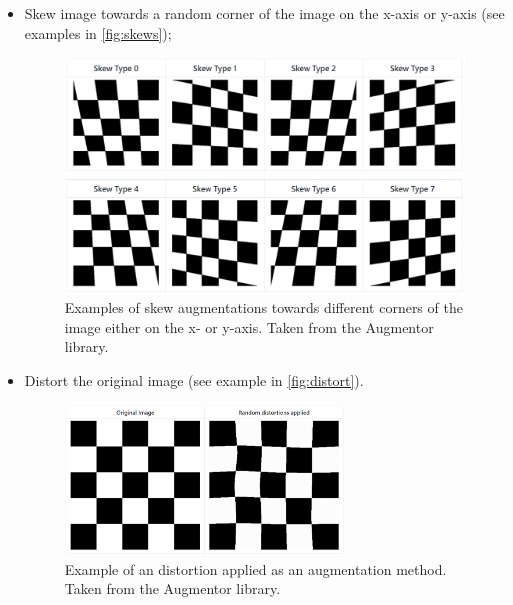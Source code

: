\begin{itemize}
\begin{figure}[ht]
        \end{figure}
        \item Skew image towards a random corner of the image on the x-axis or y-axis (see examples in \autoref{fig:skews});
        \begin{figure}[ht]
            \centering
            \includegraphics[width=\textwidth]{figs/skew.PNG}
            \caption[Examples of skew augmentations towards different corners of the image either on the x- or y-axis.]{Examples of skew augmentations towards different corners of the image either on the x- or y-axis. Taken from the Augmentor library.}
            \label{fig:skews}
        \end{figure}
        \item Distort the original image (see example in \autoref{fig:distort}).
        \begin{figure}[ht]
            \centering
            \includegraphics[width=0.7\textwidth]{figs/distortion.PNG}
            \caption[Example of an distortion applied as an augmentation method.]{Example of an distortion applied as an augmentation method. Taken from the Augmentor library.}
            \label{fig:distort}
        \end{figure}
    \end{itemize}
    
